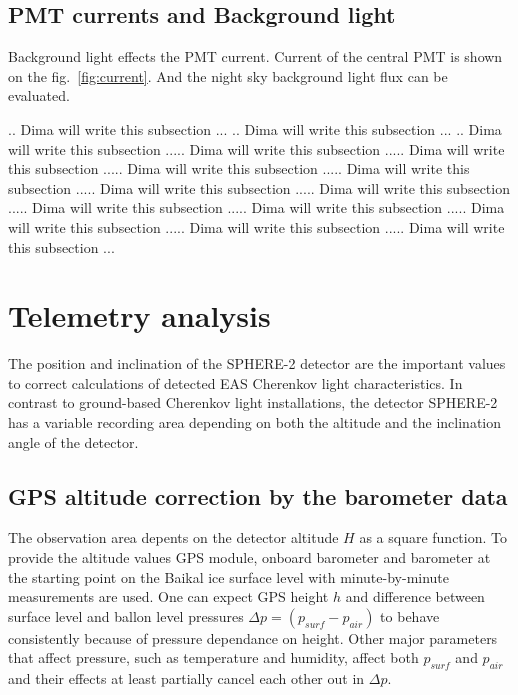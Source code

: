 \documentclass[final,5p,times,twocolumn]{elsarticle}
\begin{document}
\subsection{PMT currents and Background light}

Background light effects the PMT current. Current of the central PMT is shown on the fig.~\ref{fig:current}. And the night sky background light flux can be evaluated.

.. Dima will write this subsection ...
.. Dima will write this subsection ...
.. Dima will write this subsection ..... Dima will write this subsection ..... Dima will write this subsection ..... Dima will write this subsection ..... Dima will write this subsection ..... Dima will write this subsection ..... Dima will write this subsection ..... Dima will write this subsection ..... Dima will write this subsection ..... Dima will write this subsection ..... Dima will write this subsection ..... Dima will write this subsection ...


\section{Telemetry analysis}
The position and inclination of the SPHERE-2 detector are the important values to correct calculations of detected EAS Cherenkov light characteristics. In contrast to ground-based Cherenkov light installations, the detector SPHERE-2 has a variable recording area depending on both the altitude and the inclination angle of the detector.


\subsection{GPS altitude correction by the barometer data}

The observation area depents on the detector altitude $H$ as a square function. To provide the altitude values GPS module, onboard barometer and barometer at the starting point on the Baikal ice surface level with minute-by-minute measurements are used. One can expect GPS height $h$ and difference between surface level and ballon level pressures $\Delta p = (p_{surf} - p_{air})$ to behave consistently because of pressure dependance on height. Other major parameters that affect pressure, such as temperature and humidity, affect both $p_{surf}$ and $p_{air}$ and their effects at least partially cancel each other out in $\Delta p$.
\end{document}
